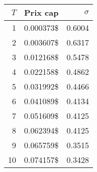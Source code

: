 \begin{tabular}{rrr}
\toprule
 $T$ &         Prix cap &     $\sigma$ \\
\midrule
   1 & \num{0.000373}\$ & \num{0.6004} \\
   2 & \num{0.003607}\$ & \num{0.6317} \\
   3 & \num{0.012168}\$ & \num{0.5478} \\
   4 & \num{0.022158}\$ & \num{0.4862} \\
   5 & \num{0.031992}\$ & \num{0.4466} \\
   6 & \num{0.041089}\$ & \num{0.4134} \\
   7 & \num{0.051609}\$ & \num{0.4125} \\
   8 & \num{0.062394}\$ & \num{0.4125} \\
   9 & \num{0.065759}\$ & \num{0.3515} \\
  10 & \num{0.074157}\$ & \num{0.3428} \\
\bottomrule
\end{tabular}
